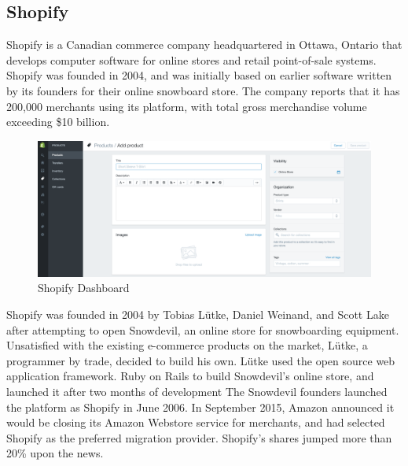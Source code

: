 \subsection{Shopify}
Shopify is a Canadian commerce company headquartered in Ottawa, Ontario that develops computer software for online stores and retail point-of-sale systems.
\newline
Shopify was founded in 2004, and was initially based on earlier software written by its founders for their online snowboard store. The company reports that it has 200,000 merchants using its platform, with total gross merchandise volume exceeding \$10 billion.
\begin{figure}[htb]
 \centering
 \includegraphics[width=1.0\linewidth]{images/chapter1/ex-shopify.png}\hfill
 \caption[Shopify Dashboard]{Shopify Dashboard}
 \label{fig:shopify_dashboard}
\end{figure}
Shopify was founded in 2004 by Tobias Lütke, Daniel Weinand, and Scott Lake after attempting to open Snowdevil, an online store for snowboarding equipment. Unsatisfied with the existing e-commerce products on the market, Lütke, a programmer by trade, decided to build his own.
Lütke used the open source web application framework. Ruby on Rails to build Snowdevil's online store, and launched it after two months of development The Snowdevil founders launched the platform as Shopify in June 2006.
In September 2015, Amazon announced it would be closing its Amazon Webstore service for merchants, and had selected Shopify as the preferred migration provider. Shopify's shares jumped more than 20\% upon the news.

